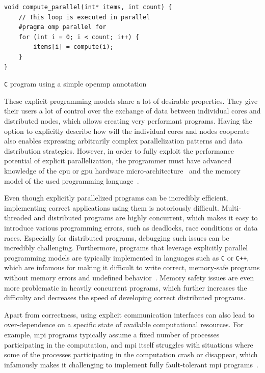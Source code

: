 \begin{description}[wide=0pt]
		\begin{listing}
			\begin{verbatim}
void compute_parallel(int* items, int count) {
	// This loop is executed in parallel
	#pragma omp parallel for
	for (int i = 0; i < count; i++) {
		items[i] = compute(i);
	}
}
        	\end{verbatim}
			\caption{\texttt{C} program using a simple \gls{openmp} annotation}
			\label{lst:openmp-annotation}
		\end{listing}
\end{description}

These explicit programming models share a lot of desirable properties. They give their users a lot
of control over the exchange of data between individual cores and distributed nodes, which allows
creating very performant programs. Having the option to explicitly describe how will the individual
cores and nodes cooperate also enables expressing arbitrarily complex parallelization patterns and
data distribution strategies. However, in order to fully exploit the performance potential of
explicit parallelization, the programmer must have advanced knowledge of the \gls{cpu}
or \gls{gpu} hardware micro-architecture~\cite{intel_developer_manual} and the memory model
of the used programming language~\cite{cpp11_standard}.

Even though explicitly parallelized programs can be incredibly efficient, implementing correct
applications using them is notoriously difficult. Multi-threaded and distributed programs are
highly concurrent, which makes it easy to introduce various programming errors, such as deadlocks,
race conditions or data races. Especially for distributed programs, debugging such issues can be
incredibly challenging. Furthermore, programs that leverage explicitly parallel programming models
are typically implemented in languages such as \texttt{C} or \texttt{C++},
which are infamous for making it difficult to write correct, memory-safe programs without memory
errors and undefined behavior~\cite{memory_safety_report}. Memory safety issues are even more
problematic in heavily concurrent programs, which further increases the difficulty and decreases
the speed of developing correct distributed programs.

Apart from correctness, using explicit communication interfaces can also lead to over-dependence on
a specific state of available computational resources. For example, \gls{mpi} programs
typically assume a fixed number of processes participating in the computation, and
\gls{mpi} itself struggles with situations where some of the processes participating
in the computation crash or disappear, which infamously makes it challenging to implement fully
fault-tolerant \gls{mpi} programs~\cite{fault_tolerant_mpi}.

